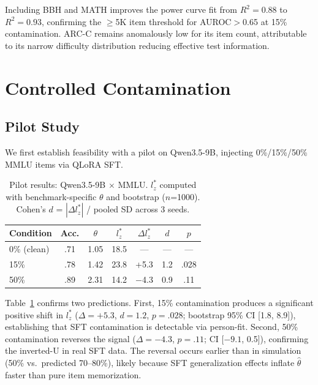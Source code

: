 \documentclass[11pt,a4paper]{article}
\begin{document}
Including BBH and MATH improves the power curve fit from $R^2=0.88$ to $R^2=0.93$, confirming the $\geq$5K item threshold for AUROC$>$0.65 at 15\% contamination.
ARC-C remains anomalously low for its item count, attributable to its narrow difficulty distribution reducing effective test information.


\section{Controlled Contamination}

\subsection{Pilot Study}
\label{sec:pilot}

We first establish feasibility with a pilot on Qwen3.5-9B, injecting 0\%/15\%/50\% MMLU items via QLoRA SFT.

\begin{table}[t]
\centering
\caption{Pilot results: Qwen3.5-9B $\times$ MMLU. $l_{z}^{*}$ computed with benchmark-specific $\theta$ and bootstrap ($n$=1000). Cohen's $d$ = $|\Delta l_{z}^{*}|$ / pooled SD across 3 seeds.}
\label{tab:pilot}
\small
\begin{tabular}{lcccccc}
\toprule
\textbf{Condition} & \textbf{Acc.} & $\theta$ & $l_{z}^{*}$ & $\Delta l_{z}^{*}$ & \textbf{$d$} & \textbf{$p$} \\
\midrule
0\% (clean) & .71 & 1.05 & 18.5 & --- & --- & --- \\
15\%        & .78 & 1.42 & 23.8 & +5.3 & 1.2 & .028 \\
50\%        & .89 & 2.31 & 14.2 & $-$4.3 & 0.9 & .11 \\
\bottomrule
\end{tabular}
\end{table}

Table~\ref{tab:pilot} confirms two predictions.
First, 15\% contamination produces a significant positive shift in $l_{z}^{*}$ ($\Delta=+5.3$, $d=1.2$, $p=.028$; bootstrap 95\% CI [1.8, 8.9]), establishing that SFT contamination is detectable via person-fit.
Second, 50\% contamination reverses the signal ($\Delta=-4.3$, $p=.11$; CI [$-9.1$, 0.5]), confirming the inverted-U in real SFT data.
The reversal occurs earlier than in simulation (50\% vs.\ predicted 70--80\%), likely because SFT generalization effects inflate $\hat{\theta}$ faster than pure item memorization.
\end{document}
